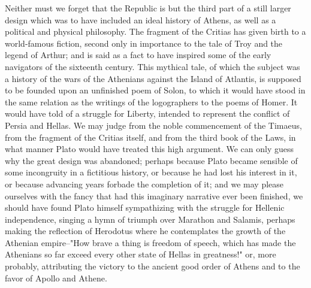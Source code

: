Neither must we forget that the Republic is but the third part of a still larger design which was to have included an ideal history of Athens, as well as a political and physical philosophy. The fragment of the Critias has given birth to a world-famous fiction, second only in importance to the tale of Troy and the legend of Arthur; and is said as a fact to have inspired some of the early navigators of the sixteenth century. This mythical tale, of which the subject was a history of the wars of the Athenians against the Island of Atlantis, is supposed to be founded upon an unfinished poem of Solon, to which it would have stood in the same relation as the writings of the logographers to the poems of Homer. It would have told of a struggle for Liberty, intended to represent the conflict of Persia and Hellas. We may judge from the noble commencement of the Timaeus, from the fragment of the Critias itself, and from the third book of the Laws, in what manner Plato would have treated this high argument. We can only guess why the great design was abandoned; perhaps because Plato became sensible of some incongruity in a fictitious history, or because he had lost his interest in it, or because advancing years forbade the completion of it; and we may please ourselves with the fancy that had this imaginary narrative ever been finished, we should have found Plato himself sympathizing with the struggle for Hellenic independence, singing a hymn of triumph over Marathon and Salamis, perhaps making the reflection of Herodotus where he contemplates the growth of the Athenian empire--"How brave a thing is freedom of speech, which has made the Athenians so far exceed every other state of Hellas in greatness!" or, more probably, attributing the victory to the ancient good order of Athens and to the favor of Apollo and Athene.


